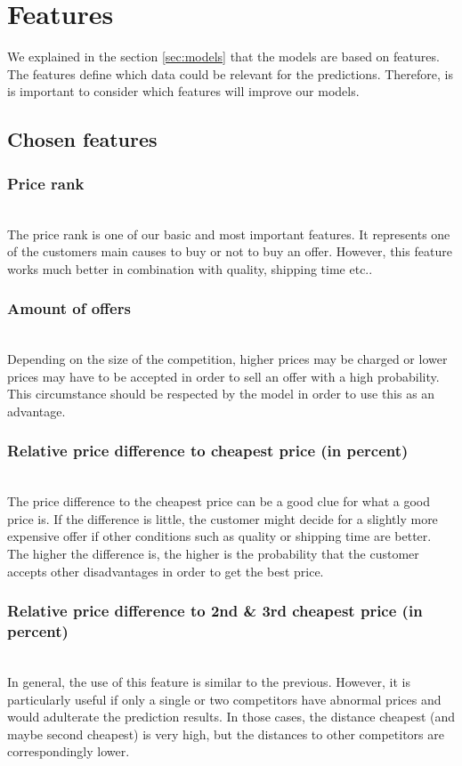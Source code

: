 \section{Features}
\label{sec:features}

	We explained in the section \ref{sec:models} that the models are based on features. The features define which data could be relevant for the predictions. Therefore, is is important to consider which features will improve our models.
\subsection{Chosen features}
	\subsubsection{Price rank}
	\label{sec:pricerank}
		~\\
		The price rank is one of our basic and most important features. It represents one of the customers main causes to buy or not to buy an offer. However, this feature works much better in combination with quality, shipping time etc..
	\subsubsection{Amount of offers}
		~\\
		Depending on the size of the competition, higher prices may be charged or lower prices may have to be accepted in order to sell an offer with a high probability. This circumstance should be respected by the model in order to use this as an advantage.
	\subsubsection{Relative price difference to cheapest price (in percent)}
		~\\
		The price difference to the cheapest price can be a good clue for what a good price is. If the difference is little, the customer might decide for a slightly more expensive offer if other conditions such as quality or shipping time are better. The higher the difference is, the higher is the probability that the customer accepts other disadvantages in order to get the best price.
	\subsubsection{Relative price difference to 2nd \& 3rd cheapest price (in percent)}
	\label{sec:pricediff3}
		~\\
		In general, the use of this feature is similar to the previous. However, it is particularly useful if only a single or two competitors have abnormal prices and would adulterate the prediction results. In those cases, the distance cheapest (and maybe second cheapest) is very high, but the distances to other competitors are correspondingly lower.
